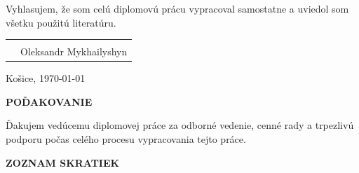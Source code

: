 \documentclass[journal,a4paper,onecolumn]{IEEEtran}
\begin{document}
\vspace{2.5cm}
\noindent
Vyhlasujem, že som celú diplomovú prácu vypracoval samostatne a uviedol som všetku použitú
literatúru.

\vspace{4cm}
\noindent
\begin{tabular}{@{}p{7cm} p{7cm}@{}}
 & \dotfill \\
 & \centering Oleksandr Mykhailyshyn
\end{tabular}

\vspace{1cm}
\noindent
Košice, \today

\clearpage
\vspace*{4cm}
\begin{center}
  {\Large\textbf{POĎAKOVANIE}}
\end{center}

\vspace{2cm}
\noindent
Ďakujem vedúcemu diplomovej práce za odborné vedenie, cenné rady a trpezlivú podporu počas
celého procesu vypracovania tejto práce.

\clearpage
\tableofcontents

\clearpage
\listoffigures

\clearpage
\begin{center}
  {\Large\textbf{ZOZNAM SKRATIEK}}
\end{center}
\end{document}
